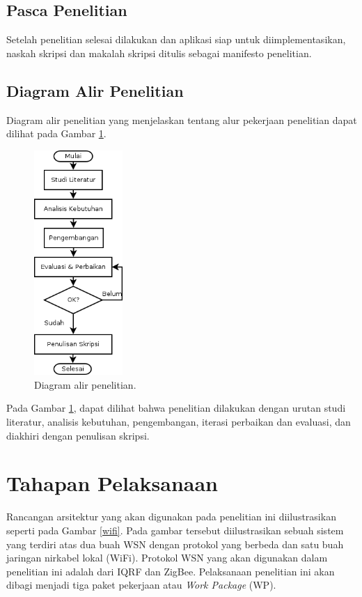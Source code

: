	\subsection{Pasca Penelitian}
		Setelah penelitian selesai dilakukan dan aplikasi siap untuk diimplementasikan, naskah skripsi dan makalah skripsi ditulis sebagai manifesto penelitian.

	\subsection{Diagram Alir Penelitian}
		Diagram alir penelitian yang menjelaskan tentang alur pekerjaan penelitian dapat dilihat pada Gambar \ref{flowchart-penelitian}.

		\begin{figure}[H]
		  \centering
		    \includegraphics[width=0.3\textwidth]{gambar/flowchart}
		    \caption{Diagram alir penelitian.}
		    \label{flowchart-penelitian}
		\end{figure}

		Pada Gambar \ref{flowchart-penelitian}, dapat dilihat bahwa penelitian dilakukan dengan urutan studi literatur, analisis kebutuhan, pengembangan, iterasi perbaikan dan evaluasi, dan diakhiri dengan penulisan skripsi.


\section{Tahapan Pelaksanaan}
	Rancangan arsitektur yang akan digunakan pada penelitian ini diilustrasikan seperti pada Gambar \ref{wifi}. Pada gambar tersebut diilustrasikan sebuah sistem yang terdiri atas dua buah WSN dengan protokol yang berbeda dan satu buah jaringan nirkabel lokal (WiFi). Protokol WSN yang akan digunakan dalam penelitian ini adalah dari IQRF dan ZigBee. Pelaksanaan penelitian ini akan dibagi menjadi tiga paket pekerjaan atau \emph{Work Package} (WP).

